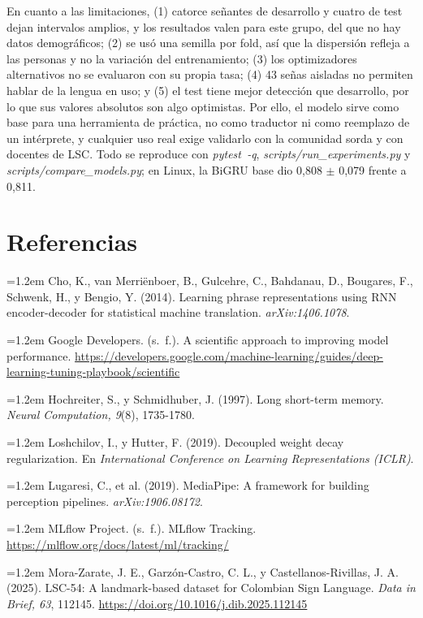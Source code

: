 \documentclass[11pt,a4paper]{article}
\newcommand{\code}[1]{\textit{#1}}
\begin{document}
En cuanto a las limitaciones, (1) catorce señantes de desarrollo y cuatro de test dejan intervalos amplios, y los resultados valen para este grupo, del que no hay datos demográficos; (2) se usó una semilla por fold, así que la dispersión refleja a las personas y no la variación del entrenamiento; (3) los optimizadores alternativos no se evaluaron con su propia tasa; (4) 43 señas aisladas no permiten hablar de la lengua en uso; y (5) el test tiene mejor detección que desarrollo, por lo que sus valores absolutos son algo optimistas. Por ello, el modelo sirve como base para una herramienta de práctica, no como traductor ni como reemplazo de un intérprete, y cualquier uso real exige validarlo con la comunidad sorda y con docentes de LSC. Todo se reproduce con \mbox{\code{pytest -q}}, \code{scripts/run\_experiments.py} y \code{scripts/compare\_models.py}; en Linux, la BiGRU base dio 0,808 $\pm$ 0,079 frente a 0,811.

\section*{Referencias}
\sloppy\footnotesize
\setlength{\parskip}{2pt}
\noindent\hangindent=1.2em Cho, K., van Merriënboer, B., Gulcehre, C., Bahdanau, D., Bougares, F., Schwenk, H., y Bengio, Y. (2014). Learning phrase representations using RNN encoder-decoder for statistical machine translation. \emph{arXiv:1406.1078}.\par
\noindent\hangindent=1.2em Google Developers. (s.~f.). A scientific approach to improving model performance. \url{https://developers.google.com/machine-learning/guides/deep-learning-tuning-playbook/scientific}\par
\noindent\hangindent=1.2em Hochreiter, S., y Schmidhuber, J. (1997). Long short-term memory. \emph{Neural Computation, 9}(8), 1735-1780.\par
\noindent\hangindent=1.2em Loshchilov, I., y Hutter, F. (2019). Decoupled weight decay regularization. En \emph{International Conference on Learning Representations (ICLR)}.\par
\noindent\hangindent=1.2em Lugaresi, C., et al. (2019). MediaPipe: A framework for building perception pipelines. \emph{arXiv:1906.08172}.\par
\noindent\hangindent=1.2em MLflow Project. (s.~f.). MLflow Tracking. \url{https://mlflow.org/docs/latest/ml/tracking/}\par
\noindent\hangindent=1.2em Mora-Zarate, J. E., Garzón-Castro, C. L., y Castellanos-Rivillas, J. A. (2025). LSC-54: A landmark-based dataset for Colombian Sign Language. \emph{Data in Brief, 63}, 112145. \url{https://doi.org/10.1016/j.dib.2025.112145}\par
\end{document}
